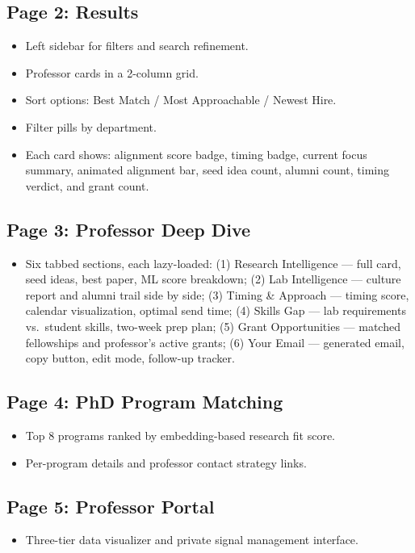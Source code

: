 \documentclass{article}
\begin{document}
\subsection{Page 2: Results}
\begin{itemize}
  \item Left sidebar for filters and search refinement.
  \item Professor cards in a 2-column grid.
  \item Sort options: Best Match / Most Approachable / Newest Hire.
  \item Filter pills by department.
  \item Each card shows: alignment score badge, timing badge, current focus
        summary, animated alignment bar, seed idea count, alumni count,
        timing verdict, and grant count.
\end{itemize}

\subsection{Page 3: Professor Deep Dive}
\begin{itemize}
  \item Six tabbed sections, each lazy-loaded:
        (1) Research Intelligence — full card, seed ideas, best paper, ML score breakdown;
        (2) Lab Intelligence — culture report and alumni trail side by side;
        (3) Timing \& Approach — timing score, calendar visualization, optimal send time;
        (4) Skills Gap — lab requirements vs.\ student skills, two-week prep plan;
        (5) Grant Opportunities — matched fellowships and professor's active grants;
        (6) Your Email — generated email, copy button, edit mode, follow-up tracker.
\end{itemize}

\subsection{Page 4: PhD Program Matching}
\begin{itemize}
  \item Top 8 programs ranked by embedding-based research fit score.
  \item Per-program details and professor contact strategy links.
\end{itemize}

\subsection{Page 5: Professor Portal}
\begin{itemize}
  \item Three-tier data visualizer and private signal management interface.
\end{itemize}
\end{document}
